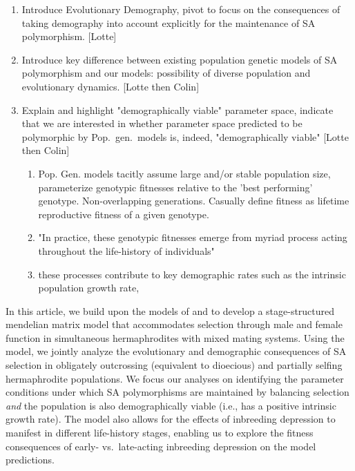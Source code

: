 \documentclass[11pt]{article}
\begin{document}
\begin{enumerate}
	\item Introduce Evolutionary Demography, pivot to focus on the consequences of taking demography into account explicitly for the maintenance of SA polymorphism. [Lotte]
	\item Introduce key difference between existing population genetic models of SA polymorphism and our models: possibility of diverse population and evolutionary dynamics. [Lotte then Colin]
	\item Explain and highlight "demographically viable" parameter space, indicate that we are interested in whether parameter space predicted to be polymorphic by Pop.~gen.~models is, indeed, "demographically viable" [Lotte then Colin]
		\begin{enumerate}
			\item Pop. Gen. models tacitly assume large and/or stable population size, parameterize genotypic fitnesses relative to the 'best performing' genotype. Non-overlapping generations. Casually define fitness as lifetime reproductive fitness of a given genotype.
			\item "In practice, these genotypic fitnesses emerge from myriad process acting throughout the life-history of individuals"
			\item these processes contribute to key demographic rates such as the intrinsic population growth rate, 
		\end{enumerate}
\end{enumerate}
\bigskip

In this article, we build upon the models of \citet{deVriesCaswell2019a} and \citet{deVriesCaswell2019b} to develop a stage-structured mendelian matrix model that accommodates selection through male and female function in simultaneous hermaphrodites with mixed mating systems. Using the model, we jointly analyze the evolutionary and demographic consequences of SA selection in obligately outcrossing (equivalent to dioecious) and partially selfing hermaphrodite populations. We focus our analyses on identifying the parameter conditions under which SA polymorphisms are maintained by balancing selection {\itshape and} the population is also demographically viable (i.e., has a positive intrinsic growth rate). The model also allows for the effects of inbreeding depression to manifest in different life-history stages, enabling us to explore the fitness consequences of early- vs.~late-acting inbreeding depression on the model predictions.
\end{document}
